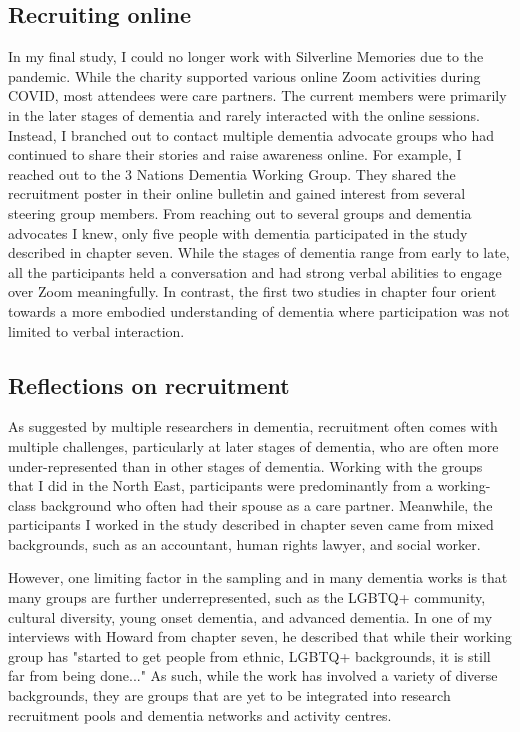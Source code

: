 \subsection{Recruiting online}
\label{Method:RecruitOnline}
In my final study, I could no longer work with Silverline Memories due to the pandemic. While the charity supported various online Zoom activities during COVID, most attendees were care partners. The current members were primarily in the later stages of dementia and rarely interacted with the online sessions. Instead, I branched out to contact multiple dementia advocate groups who had continued to share their stories and raise awareness online. For example, I reached out to the 3 Nations Dementia Working Group. They shared the recruitment poster in their online bulletin and gained interest from several steering group members. From reaching out to several groups and dementia advocates I knew, only five people with dementia participated in the study described in chapter seven. While the stages of dementia range from early to late, all the participants held a conversation and had strong verbal abilities to engage over Zoom meaningfully. In contrast, the first two studies in chapter four orient towards a more embodied understanding of dementia where participation was not limited to verbal interaction.

\subsection{Reflections on recruitment}
As suggested by multiple researchers in dementia, recruitment often comes with multiple challenges, particularly at later stages of dementia, who are often more under-represented than in other stages of dementia. Working with the groups that I did in the North East, participants were predominantly from a working-class background who often had their spouse as a care partner. Meanwhile, the participants I worked in the study described in chapter seven came from mixed backgrounds, such as an accountant, human rights lawyer, and social worker. 

However, one limiting factor in the sampling and in many dementia works is that many groups are further underrepresented, such as the LGBTQ+ community, cultural diversity, young onset dementia, and advanced dementia. In one of my interviews with Howard from chapter seven, he described that while their working group has "started to get people from ethnic, LGBTQ+ backgrounds, it is still far from being done..." As such, while the work has involved a variety of diverse backgrounds, they are groups that are yet to be integrated into research recruitment pools and dementia networks and activity centres. 


